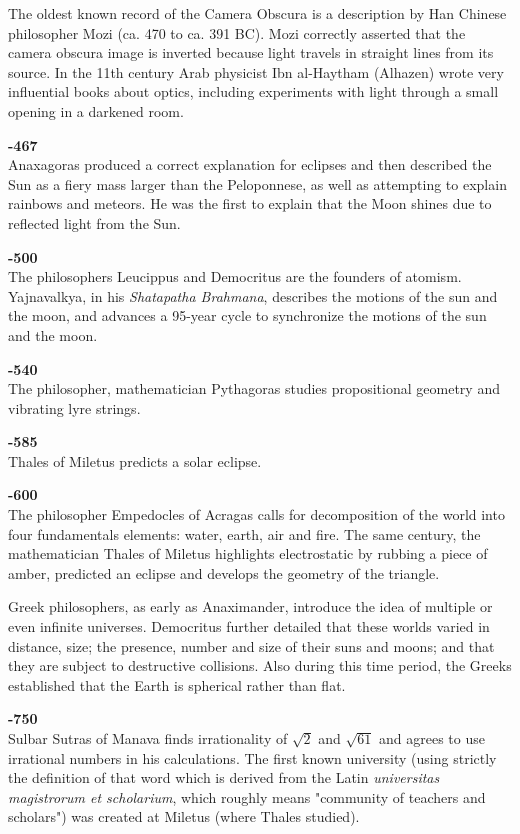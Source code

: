 The oldest known record of the Camera Obscura is a description by Han Chinese philosopher Mozi (ca. 470 to ca. 391 BC).  Mozi correctly asserted that the camera obscura image is inverted because light travels in straight lines from its source. In the 11th century Arab physicist Ibn al-Haytham (Alhazen) wrote very influential books about optics, including experiments with light through a small opening in a darkened room.

\textbf{-467}\\
Anaxagoras produced a correct explanation for eclipses and then described the Sun as a fiery mass larger than the Peloponnese, as well as attempting to explain rainbows and meteors. He was the first to explain that the Moon shines due to reflected light from the Sun.

\textbf{-500}\\
The philosophers Leucippus and Democritus are the founders of atomism. Yajnavalkya, in his \textit{Shatapatha Brahmana}, describes the motions of the sun and the moon, and advances a 95-year cycle to synchronize the motions of the sun and the moon. 

\textbf{-540}\\
The philosopher, mathematician Pythagoras studies propositional geometry and vibrating lyre strings. 

\textbf{-585}\\
Thales of Miletus predicts a solar eclipse.

\textbf{-600}\\
The philosopher Empedocles of Acragas calls for decomposition of the world into four fundamentals elements: water, earth, air and fire. The same century, the mathematician Thales of Miletus highlights electrostatic by rubbing a piece of amber, predicted an eclipse and develops the geometry of the triangle.

Greek philosophers, as early as Anaximander, introduce the idea of multiple or even infinite universes. Democritus further detailed that these worlds varied in distance, size; the presence, number and size of their suns and moons; and that they are subject to destructive collisions. Also during this time period, the Greeks established that the Earth is spherical rather than flat.

\textbf{-750}\\
Sulbar Sutras of Manava finds irrationality of $\sqrt{2}$ and $\sqrt{61}$ and agrees to use irrational numbers in his calculations. The first known university (using strictly the definition of that word which is derived from the Latin \textit{universitas magistrorum et scholarium}, which roughly means "community of teachers and scholars") was created at Miletus (where Thales studied).

